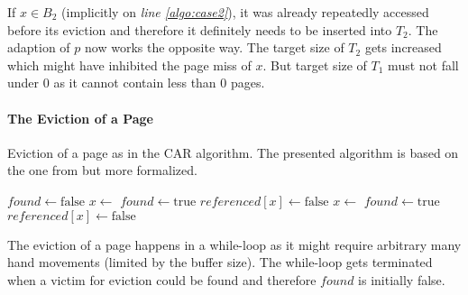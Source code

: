 	If $x \in B_2$ (implicitly on \emph{line \ref{algo:case2}}), it was already repeatedly accessed before its eviction and therefore it definitely needs to be inserted into $T_2$. The adaption of $p$ now works the opposite way. The target size of $T_2$ gets increased which might have inhibited the page miss of $x$. But target size of $T_1$ must not fall under $0$ as it cannot contain less than $0$ pages.

\paragraph{The Eviction of a Page}

\begin{@empty}
	\begin{algorithm}[ht!]
		\caption{Eviction of a page as in the CAR algorithm. The presented algorithm is based on the one from \cite{Bansal:2004} but more formalized.}
		\label{alg:evict}
		\begin{algorithmic}[1]
				\State $found \gets \text{false}$
						\State $x \gets $	\label{algo:gett1}	\label{algo:evictt1begin}
							\State $found \gets \text{true}$
							\State {}	\label{algo:removet1}
							\State {}
						\Else
							\State $referenced\left[x\right] \gets \text{false}$ \label{algo:unset3}
							\State {}
						\EndIf	\label{algo:evictt1end}
					\Else
						\State $x \gets $	\label{algo:evictt2begin}
							\State $found \gets \text{true}$
							\State \Call{remove\_next}{$T_2$}
							\State {}
						\Else
							\State $referenced\left[x\right] \gets \text{false}$
							\State {}
						\EndIf	\label{algo:evictt2end}
					\EndIf
				\EndWhile
			\EndProcedure
		\end{algorithmic}
	\end{algorithm}
\end{@empty}

	The eviction of a page happens in a while-loop as it might require arbitrary many hand movements (limited by the buffer size). The while-loop gets terminated when a victim for eviction could be found and therefore $found$ is initially false.
	
